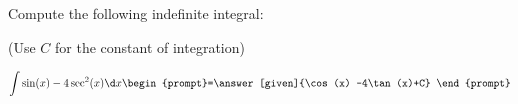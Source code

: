 \documentclass{ximera}
\author{Jim Talamo}
\begin{document}
\begin{exercise}
Compute the following indefinite integral:

\begin{prompt} (Use $C$ for the constant of integration) \end{prompt}

\[
\int \sin(x)-4\sec^2(x) \d x 
\begin{prompt}=\answer[given]{\cos(x) -4\tan(x)+C} \end{prompt}
\]

\end{exercise}
\end{document}
